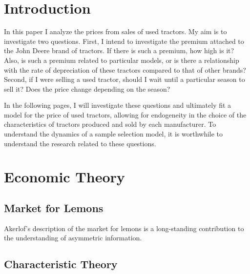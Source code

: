 %
%
%

\section{Introduction}

In this paper I analyze the prices from sales of used tractors. 
My aim is to investigate two questions.
First, I intend to investigate the premium attached to the John Deere brand of tractors. 
If there is such a premium, how high is it? 
Also, is such a premium related to particular models, 
or is there a relationship with the rate of depreciation of these tractors 
compared to that of other brands?
Second, if I were selling a used tractor, should I wait until a particular season to sell it?
Does the price change depending on the season? 

In the following pages, I will investigate these questions and
ultimately fit a model for the price of used tractors, 
allowing for endogeneity in the choice of the
characteristics of tractors produced and sold by each manufacturer. 
To understand the dynamics of a sample selection model, 
it is worthwhile to understand the research related to these questions. 



\section{Economic Theory}

\subsection{Market for Lemons}

Akerlof's description of the market for lemons is a long-standing contribution to the understanding of asymmetric information. 


\subsection{Characteristic Theory}

